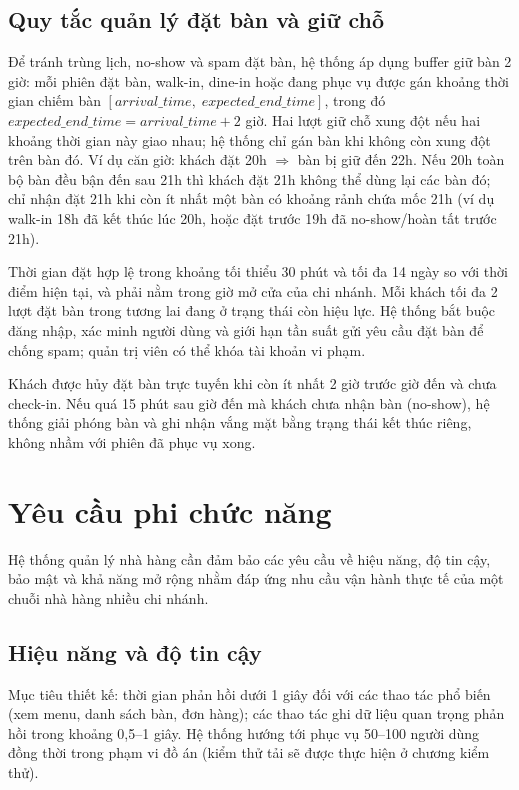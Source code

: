 ﻿\documentclass[../DoAn.tex]{subfiles}
\begin{document}
\subsection{Quy tắc quản lý đặt bàn và giữ chỗ}

Để tránh trùng lịch, no-show và spam đặt bàn, hệ thống áp dụng buffer giữ bàn 2 giờ: mỗi phiên đặt bàn, walk-in, dine-in hoặc đang phục vụ được gán khoảng thời gian chiếm bàn $[\mathit{arrival\_time},\; \mathit{expected\_end\_time}]$, trong đó $\mathit{expected\_end\_time} = \mathit{arrival\_time} + 2$ giờ. Hai lượt giữ chỗ xung đột nếu hai khoảng thời gian này giao nhau; hệ thống chỉ gán bàn khi không còn xung đột trên bàn đó. Ví dụ căn giờ: khách đặt 20h $\Rightarrow$ bàn bị giữ đến 22h. Nếu 20h toàn bộ bàn đều bận đến sau 21h thì khách đặt 21h không thể dùng lại các bàn đó; chỉ nhận đặt 21h khi còn ít nhất một bàn có khoảng rảnh chứa mốc 21h (ví dụ walk-in 18h đã kết thúc lúc 20h, hoặc đặt trước 19h đã no-show/hoàn tất trước 21h).

Thời gian đặt hợp lệ trong khoảng tối thiểu 30 phút và tối đa 14 ngày so với thời điểm hiện tại, và phải nằm trong giờ mở cửa của chi nhánh. Mỗi khách tối đa 2 lượt đặt bàn trong tương lai đang ở trạng thái còn hiệu lực. Hệ thống bắt buộc đăng nhập, xác minh người dùng và giới hạn tần suất gửi yêu cầu đặt bàn để chống spam; quản trị viên có thể khóa tài khoản vi phạm.

Khách được hủy đặt bàn trực tuyến khi còn ít nhất 2 giờ trước giờ đến và chưa check-in. Nếu quá 15 phút sau giờ đến mà khách chưa nhận bàn (no-show), hệ thống giải phóng bàn và ghi nhận vắng mặt bằng trạng thái kết thúc riêng, không nhầm với phiên đã phục vụ xong.

\section{Yêu cầu phi chức năng}

Hệ thống quản lý nhà hàng cần đảm bảo các yêu cầu về hiệu năng, độ tin cậy, bảo mật và khả năng mở rộng nhằm đáp ứng nhu cầu vận hành thực tế của một chuỗi nhà hàng nhiều chi nhánh.

\subsection{Hiệu năng và độ tin cậy}
Mục tiêu thiết kế: thời gian phản hồi dưới 1 giây đối với các thao tác phổ biến (xem menu, danh sách bàn, đơn hàng); các thao tác ghi dữ liệu quan trọng phản hồi trong khoảng 0,5--1 giây. Hệ thống hướng tới phục vụ 50--100 người dùng đồng thời trong phạm vi đồ án (kiểm thử tải sẽ được thực hiện ở chương kiểm thử).
\end{document}
